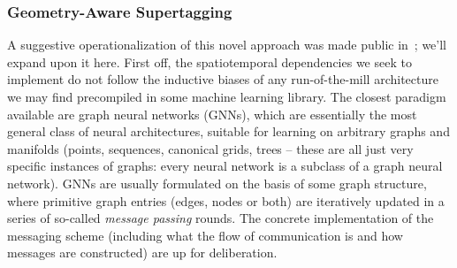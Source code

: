 \subsubsection{Geometry-Aware Supertagging}
\label{subsubsection:gas}
A suggestive operationalization of this novel approach was made public in~\citet[preprint]{kogkalidis2022geometryaware}; we'll expand upon it here.
First off, the spatiotemporal dependencies we seek to implement do not follow the inductive biases of any run-of-the-mill architecture we may find precompiled in some machine learning library.
The closest paradigm available are graph neural networks (GNNs), which are essentially the most general class of neural architectures, suitable for learning on arbitrary graphs and manifolds (points, sequences, canonical grids, trees -- these are all just very specific instances of graphs: every neural network is a subclass of a graph neural network).
GNNs are usually formulated on the basis of some graph structure, where primitive graph entries (edges, nodes or both) are iteratively updated in a series of so-called \textit{message passing} rounds.
The concrete implementation of the messaging scheme (including what the flow of communication is and how messages are constructed) are up for deliberation.

